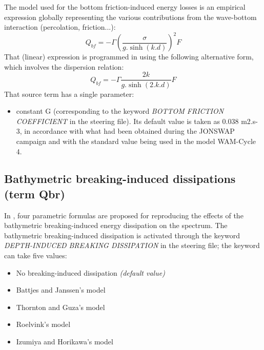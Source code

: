  The model used for the bottom friction-induced energy losses is an empirical expression globally representing the various contributions from the wave-bottom interaction (percolation, friction...):
\begin{equation} \label{GrindEQ__4_42_}
Q_{bf} =-\Gamma \left(\frac{\sigma }{g.\sinh \left(k.d\right)} \right)^{2} F
\end{equation}
That (linear) expression is programmed in \tomawac using the following alternative form, which involves the dispersion relation:
\begin{equation} \label{GrindEQ__4_43_}
Q_{bf} =-\Gamma \frac{2k}{g.\sinh \left(2.k.d\right)} F
\end{equation}
That source term has a single parameter:

\begin{itemize}
\item  constant G (corresponding to the keyword \textit{BOTTOM FRICTION COEFFICIENT} in the steering file). Its default value is taken as 0.038 m2.s-3, in accordance with what had been obtained during the JONSWAP campaign \cite{Hasselmann1973} and with the standard value being used in the model WAM-Cycle 4.
\end{itemize}

\subsection{ Bathymetric breaking-induced dissipations (term Qbr)}

 In \tomawac, four parametric formulas are proposed for reproducing the effects of the bathymetric breaking-induced energy dissipation on the spectrum. The bathymetric breaking-induced dissipation is activated through the keyword \textit{DEPTH-INDUCED BREAKING DISSIPATION} in the steering file; the keyword can take five values:

\begin{itemize}
\item  No breaking-induced dissipation \textit{(default value)}
\item  Battjes and Janssen's model \cite{Battjes1978}%
\item  Thornton and Guza's model \cite{Thornton1983}%
\item  Roelvink's model \cite{Roelvink1993}%
\item  Izumiya and Horikawa's model \cite{Izumiya1984}%
\end{itemize}

